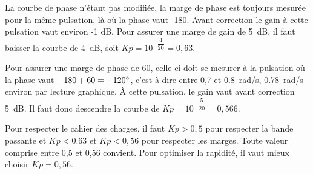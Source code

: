 \ifprof
\begin{corrige}
La courbe de phase n'étant pas modifiée, la marge de phase est toujours mesurée pour la
même pulsation, là où la phase vaut -180\degres. Avant correction le gain à cette pulsation vaut
environ -1 dB. Pour assurer une marge de gain de \SI{5}{dB}, il faut baisser la courbe de \SI{4}{dB},
soit $Kp=10^{-\dfrac{4}{20}}=0,63$.
\end{corrige}
\else
\fi

\ifprof
\begin{corrige}
Pour assurer une marge de phase de 60\degres, celle-ci doit se mesurer à la pulsation où la phase
vaut $-180+60=-120^{\circ}$, c'est à dire entre 0,7 et \SI{0,8}{rad/s}, \SI{0,78}{rad/s} environ par lecture
graphique. À cette pulsation, le gain vaut avant correction \SI{5}{dB}. Il faut donc descendre la
courbe de $Kp=10^{-\dfrac{5}{20}}=0,566$.
\end{corrige}
\else
\fi

\ifprof
\begin{corrige}
Pour respecter le cahier des charges, il faut $Kp > 0,5$ pour respecter la bande passante et
$Kp<0.63$ et $Kp<0,56$ pour respecter les marges. Toute valeur comprise entre 0,5 et 0,56
convient. Pour optimiser la rapidité, il vaut mieux choisir $Kp=0,56$.
\end{corrige}
\else
\fi


